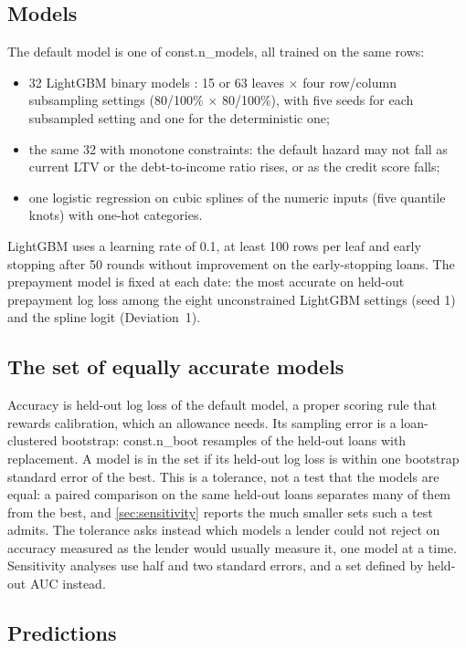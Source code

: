 \subsection{Models}

The default model is one of \num{const.n_models}, all trained on the same rows:
\begin{itemize}[nosep]
\item 32 LightGBM binary models \citep{ke2017lightgbm}: 15 or 63 leaves $\times$ four
row/column subsampling settings (80/100\% $\times$ 80/100\%), with five seeds
for each subsampled setting and one for the deterministic one;
\item the same 32 with monotone constraints: the default hazard may not fall as
current LTV or the debt-to-income ratio rises, or as the credit score falls;
\item one logistic regression on cubic splines of the numeric inputs (five
quantile knots) with one-hot categories.
\end{itemize}
LightGBM uses a learning rate of 0.1, at least 100 rows per leaf and early
stopping after 50 rounds without improvement on the early-stopping loans. The
prepayment model is fixed at each date: the most accurate on held-out
prepayment log loss among the eight unconstrained LightGBM settings (seed 1)
and the spline logit (Deviation~1).

\subsection{The set of equally accurate models}\label{sec:set}

Accuracy is held-out log loss of the default model, a proper scoring rule that
rewards calibration, which an allowance needs. Its sampling error is a
loan-clustered bootstrap: \num{const.n_boot} resamples of the held-out loans
with replacement. A model is in the set if its held-out log loss is within one
bootstrap standard error of the best. This is a tolerance,
not a test that the models are equal: a paired comparison on the same held-out
loans separates many of them from the best, and \cref{sec:sensitivity}
reports the much smaller sets such a test admits. The tolerance asks instead
which models a lender could not reject on accuracy measured as the lender
would usually measure it, one model at a time. Sensitivity analyses use half and two standard errors, and a set defined by
held-out AUC instead.

\subsection{Predictions}\label{sec:predictions}

